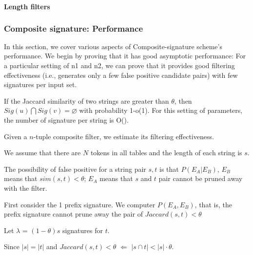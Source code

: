 \smallskip

\noindent \textbf{Length filters}


\subsubsection{Composite signature: Performance}

In this section, we cover various aspects of Composite-signature scheme's performance.
We begin by proving that it has good asymptotic performance: For a particular setting of n1 and n2, we can prove
that it provides good filtering effectiveness (i.e., generates only a few false positive candidate pairs) with few signatures per input set.

\begin{theorem} If the Jaccard similarity of two strings are greater than $\theta$, then $Sig(u) \bigcap Sig(v) = \varnothing$ with probability 1-o(1). For this setting of parameters, the number of signature per string is O().
\end{theorem}


Given a $n$-tuple composite filter, we estimate its filtering effectiveness.

We assume that there are $N$ tokens in all tables and the length of each string is $s$.

The possibility of false positive for a string pair $s, t$ is that $P(E_A | E_B)$, $E_B$ means that  $sim(s,t) < \theta$; $E_A$ means that $s$ and $t$ pair cannot be pruned away with the filter.

First consider the 1 prefix signature. We computer $P(E_A, E_B)$, that is, the prefix signature cannot prune away the pair of $Jaccard(s,t) < \theta$

Let $\lambda$ = $(1-\theta)s$ signatures for $t$.

Since $|s| = |t|$ and   $Jaccard(s,t) < \theta$ $\Longleftarrow$ $ |s \cap t| < |s| \cdot \theta$.

